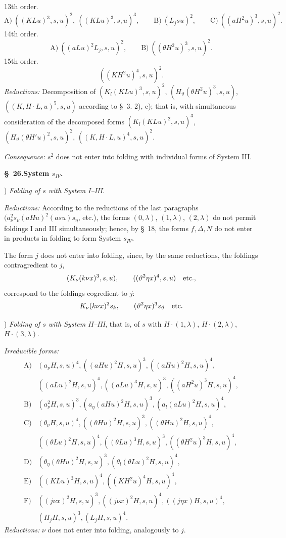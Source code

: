 \documentclass[11pt]{article}
\newcommand{\D}{\Delta}
\begin{document}
\noindent 13th order.
\[
\text{A)}\ ((KLu)^3,s,u)^2,\ ((KLu)^3,s,u)^3,\qquad
\text{B)}\ (L_jsu)^2,
\qquad
\text{C)}\ ((aH^2u)^3,s,u)^2.
\]
\noindent 14th order.
\[
\text{A)}\ ((aLu)^2L_j,s,u)^2,
\qquad
\text{B)}\ ((\theta H^2u)^3,s,u)^2.
\]
\noindent 15th order.
\[
 ((KH^2u)^4,s,u)^2.
\]
\noindent\emph{Reductions:} Decomposition of $(K_l(KLu)^3,s,u)^2$, $(H_\vartheta(\theta H^2u)^3,s,u)$, $((K,H\cdot L,u)^5,s,u)$ according to \S\ 3. 2), c); that is, with simultaneous consideration of the decomposed forms $(K_l(KLu)^2,s,u)^3$, $(H_\vartheta(\theta H'u)^2,s,u)^2$, $((K,H\cdot L,u)^4,s,u)^2$.

\noindent\emph{Consequence:} $s^2$ does not enter into folding with individual forms of System III.

\begin{center}\textbf{\S\ 26.\quad System $s_{IV}$.}\end{center}
) \emph{Folding of $s$ with System I--III.}

\noindent\emph{Reductions:} According to the reductions of the last paragraphs $(a_\nu^2s_\nu(aHu)^2(asu)s_\eta$, etc.), the forms $(0,\lambda)$, $(1,\lambda)$, $(2,\lambda)$ do not permit foldings I and III simultaneously; hence, by \S\ 18, the forms $f,\D,N$ do not enter in products in folding to form System $s_{IV}$.

The form $j$ does not enter into folding, since, by the same reductions, the foldings contragredient to $j$,
\[
(K_\nu(k\nu x)^3,s,u),\qquad ((\vartheta^2\eta x)^4,s,u)\quad\hbox{etc.},
\]
correspond to the foldings cogredient to $j$:
\[
K_\nu(k\nu x)^2s_k,
\qquad (\vartheta^2\eta x)^3s_\vartheta\quad\hbox{etc.}
\]

) \emph{Folding of $s$ with System II--III}, that is, of $s$ with $H\cdot(1,\lambda)$, $H\cdot(2,\lambda)$, $H\cdot(3,\lambda)$.

\noindent\emph{Irreducible forms:}
\[
\begin{array}{rl}
\text{A)}&(a_\nu H,s,u)^4,
((aHu)^2H,s,u)^3,
((aHu)^2H,s,u)^4,\\
&((aLu)^2H,s,u)^4,
((aLu)^3H,s,u)^3,
((aH^2u)^3H,s,u)^4,\\[0.3em]
\text{B)}&(a_\nu^2H,s,u)^3,
(a_\eta(aHu)^2H,s,u)^3,
(a_l(aLu)^2H,s,u)^4,\\[0.3em]
\text{C)}&(\theta_\nu H,s,u)^4,
((\theta Hu)^2H,s,u)^3,
((\theta Hu)^2H,s,u)^4,\\
&((\theta Lu)^2H,s,u)^4,
((\theta Lu)^3H,s,u)^3,
((\theta H^2u)^3H,s,u)^4,\\[0.3em]
\text{D)}&(\theta_\eta(\theta Hu)^2H,s,u)^3,
(\theta_l(\theta Lu)^2H,s,u)^4,\\[0.3em]
\text{E)}&((KLu)^3H,s,u)^4,
((KH^2u)^4H,s,u)^4,\\[0.3em]
\text{F)}&((j\nu x)^2H,s,u)^3,
((j\nu x)^2H,s,u)^4,
((j\eta x)H,s,u)^4,\\
&(H_jH,s,u)^3,
(L_jH,s,u)^4.
\end{array}
\]
\noindent\emph{Reductions:} $\nu$ does not enter into folding, analogously to $j$.
\end{document}
